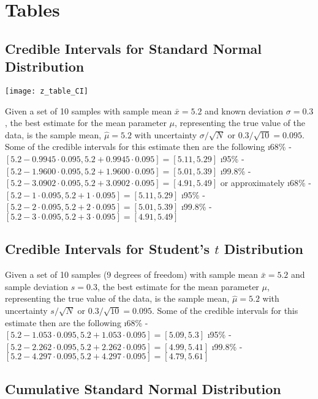 \chapter{Tables}\label{app:tables}

\section{Credible Intervals for Standard Normal Distribution}\label{sec:normal_table}
\texttt{[image: z\_table\_CI]}




Given a set of 10 samples with sample mean $\bar{x}=5.2$ and known deviation $\sigma=0.3$, the best estimate for the mean parameter $\mu$, representing the true value of the data, is the sample mean, $\hat{\mu}=5.2$ with uncertainty $\sigma/\sqrt{N}$ or $0.3/\sqrt{10}=0.095$.  Some of the credible intervals for this estimate then are the following
\bi
\i 68\% - $[5.2-0.9945 \cdot 0.095, 5.2+0.9945 \cdot 0.095] = [5.11, 5.29]$
\i 95\% - $[5.2-1.9600 \cdot 0.095, 5.2+1.9600 \cdot 0.095] = [5.01,5.39]$
\i 99.8\% - $[5.2-3.0902 \cdot 0.095, 5.2+3.0902 \cdot 0.095] = [4.91,5.49]$
\ei
or approximately
\bi
\i 68\% - $[5.2-1 \cdot 0.095, 5.2+1 \cdot 0.095] = [5.11, 5.29]$
\i 95\% - $[5.2-2 \cdot 0.095, 5.2+2 \cdot 0.095] = [5.01,5.39]$
\i 99.8\% - $[5.2-3 \cdot 0.095, 5.2+3 \cdot 0.095] = [4.91,5.49]$
\ei


\section{Credible Intervals for Student's $t$ Distribution}\label{sec:tdist_table}




Given a set of 10 samples (9 degrees of freedom) with sample mean $\bar{x}=5.2$ and sample deviation $s=0.3$, the best estimate for the mean parameter $\mu$, representing the true value of the data, is the sample mean, $\hat{\mu}=5.2$ with uncertainty $s/\sqrt{N}$ or $0.3/\sqrt{10}=0.095$.  Some of the credible intervals for this estimate then are the following
\bi
\i 68\% - $[5.2-1.053 \cdot 0.095, 5.2+1.053 \cdot 0.095] = [5.09, 5.3]$
\i 95\% - $[5.2-2.262 \cdot 0.095, 5.2+2.262 \cdot 0.095] = [4.99,5.41]$
\i 99.8\% - $[5.2-4.297 \cdot 0.095, 5.2+4.297 \cdot 0.095] = [4.79,5.61]$
\ei



\newpage
\section{Cumulative Standard Normal Distribution}\label{sec:cumulative_normal_table}


